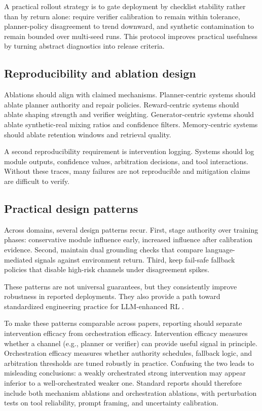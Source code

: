 ﻿\documentclass[conference]{IEEEtran}
\begin{document}
A practical rollout strategy is to gate deployment by checklist stability rather than by return alone: require verifier calibration to remain within tolerance, planner-policy disagreement to trend downward, and synthetic contamination to remain bounded over multi-seed runs. This protocol improves practical usefulness by turning abstract diagnostics into release criteria.

\subsection{Reproducibility and ablation design}
Ablations should align with claimed mechanisms. Planner-centric systems should ablate planner authority and repair policies. Reward-centric systems should ablate shaping strength and verifier weighting. Generator-centric systems should ablate synthetic-real mixing ratios and confidence filters. Memory-centric systems should ablate retention windows and retrieval quality.

A second reproducibility requirement is intervention logging. Systems should log module outputs, confidence values, arbitration decisions, and tool interactions. Without these traces, many failures are not reproducible and mitigation claims are difficult to verify.

\subsection{Practical design patterns}
Across domains, several design patterns recur. First, stage authority over training phases: conservative module influence early, increased influence after calibration evidence. Second, maintain dual grounding checks that compare language-mediated signals against environment return. Third, keep fail-safe fallback policies that disable high-risk channels under disagreement spikes.

These patterns are not universal guarantees, but they consistently improve robustness in reported deployments. They also provide a path toward standardized engineering practice for LLM-enhanced RL \cite{arxiv_p_2204_01691,arxiv_p_2404_03648,arxiv_p_2602_06493,arxiv_p_2602_02454,arxiv_p_2512_05686}.

To make these patterns comparable across papers, reporting should separate intervention efficacy from orchestration efficacy. Intervention efficacy measures whether a channel (e.g., planner or verifier) can provide useful signal in principle. Orchestration efficacy measures whether authority schedules, fallback logic, and arbitration thresholds are tuned robustly in practice. Confusing the two leads to misleading conclusions: a weakly orchestrated strong intervention may appear inferior to a well-orchestrated weaker one. Standard reports should therefore include both mechanism ablations and orchestration ablations, with perturbation tests on tool reliability, prompt framing, and uncertainty calibration.
\end{document}
